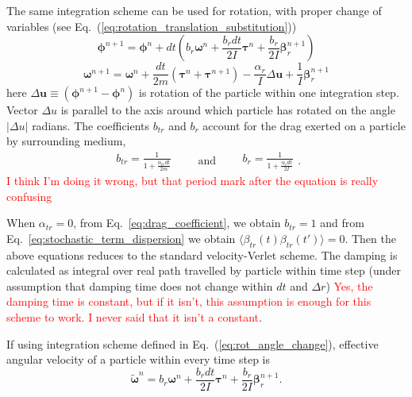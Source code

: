 The same integration scheme can be used for rotation, with proper change of variables (see Eq.~(\ref{eq:rotation_translation_substitution}))
\begin{equation}
\label{eq:rot_angle_change}
	\boldsymbol{\phi}^{n+1} = \boldsymbol{\phi}^n + dt \left(
		  b_{r} \boldsymbol{\omega}^n
		  + \frac{b_{r} dt}{2I}\boldsymbol{\tau}^n
		  + \frac{b_{r} }{2I}\boldsymbol{\beta}_{r}^{n+1}
	 \right)
\end{equation}
\begin{equation}
\label{eq:rot_ang_velocity_change}
	\boldsymbol{\omega}^{n+1} = \boldsymbol{\omega}^n
	+ \frac{dt}{2m}\left(
		\boldsymbol{\tau}^n + \boldsymbol{\tau}^{n+1}
	\right)
	- \frac{\alpha_{r}}{I}\Delta \boldsymbol{u}
	+ \frac{1}{I}\boldsymbol{\beta}_{r}^{n+1}
\end{equation}
here $\Delta \boldsymbol{u} \equiv \left(\boldsymbol{\phi}^{n+1} - \boldsymbol{\phi}^n\right)$ is rotation of the particle within one integration step. Vector $\Delta u$ is parallel to the axis around which particle has rotated on the angle $|\Delta u|$ radians. The coefficients $b_{tr}$ and $b_{r}$ account for the drag exerted on a particle by surrounding medium,
\begin{equation}
\label{eq:drag_coefficient}
	\begin{aligned}
		b_{tr} = \frac{1}{1 + \frac{\alpha_{tr} dt}{2 m}}
	\end{aligned}
	\qquad
	\text{and}
	\qquad
	\begin{aligned}
		b_r = \frac{1}{1 + \frac{\alpha_r dt}{2 I}}
	\end{aligned}
	.
\end{equation}
\textcolor{red}{I think I'm doing it wrong, but that period mark after the equation is really confusing}

When $\alpha_{tr} = 0$, from Eq.~\eqref{eq:drag_coefficient}, we obtain $b_{tr} = 1$ and from Eq.~\eqref{eq:stochastic_term_dispersion} we obtain $\langle\beta_{tr}(t)\beta_{tr}(t')\rangle = 0$. Then the above equations reduces to the standard velocity-Verlet scheme. The damping is calculated as integral  over real path travelled by particle within time step (under assumption that damping time does not change within $dt$ and $\Delta r$) \textcolor{red}{Yes, the damping time is constant, but if it isn't, this assumption is enough for this scheme to work. I never said that it isn't a constant}.

If using integration scheme defined in Eq.~(\ref{eq:rot_angle_change}), effective angular velocity of a particle within every time step is
\begin{equation}
\label{eq:effective_angular_velocity}
	\tilde{\boldsymbol{\omega}}^n = b_{r} \boldsymbol{\omega}^n
	+ \frac{b_{r} dt}{2I}\boldsymbol{\tau}^n
	+ \frac{b_{r} }{2I}\boldsymbol{\beta}_{r}^{n+1}.
\end{equation}

